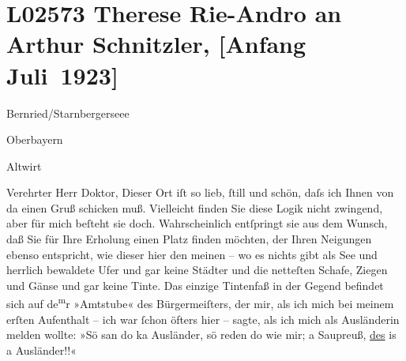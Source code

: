 

\section[Therese Rie-Andro an Arthur Schnitzler, {[}Anfang Juli 1923{]}]{L02573 Therese Rie-Andro an Arthur Schnitzler, {[}Anfang Juli 1923{]}}
\nopagebreak{}
\rehead{ }\normalsize\beginnumbering{}
\toendnotes[C]{\smallbreak\pagebreak[2]}
\pstart
           \raggedleft{}{\pb}Bernried/Starnbergerseee\pend
           
\pstart
           \raggedleft{}Oberbayern\pend
           
\pstart
           \raggedleft{}Altwirt\pend
           
\pstart{}Verehrter Herr Doktor,\pend\vspace{0.5em}
\pstart
           Dieser Ort iſt so lieb, ſtill und schön, daſs ich Ihnen von da einen Gruß schicken
               muß. Vielleicht finden Sie diese Logik nicht zwingend, aber für mich beſteht sie
               doch. Wahrscheinlich entſpringt sie aus dem Wunsch, daß Sie für Ihre Erholung einen
               Platz finden möchten, der Ihren Neigungen ebenso entspricht, wie dieser hier den
               meinen – wo es nichts gibt als See und herrlich bewaldete Ufer und gar keine Städter
               und die netteſten Schafe, Ziegen und Gänse und gar keine Tinte. {\pb}Das einzige Tintenfaß in der Gegend befindet sich auf de\substVorne{}\textsuperscript{m}\substDazwischen{}r\substHinten{} »Amtstube« des Bürgermeiſters, der mir, als ich mich bei meinem erſten
               Aufenthalt – ich war ſchon öfters hier – sagte, als ich mich als Ausländerin melden
               wollte: »Sö san do ka Ausländer, sö reden do wie mir; a Saupreuß, \uline{des} is a
               Ausländer!!«\pend
           
